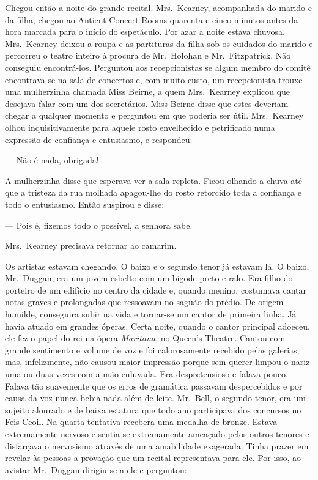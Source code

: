 Chegou então a noite do grande recital.  Mrs.~Kearney, acompanhada do marido e
da filha, chegou ao Antient Concert Rooms quarenta e cinco minutos antes da
hora marcada para o início do espetáculo.  Por azar a noite estava chuvosa.
Mrs.~Kearney deixou a roupa e as partituras da filha sob os cuidados do marido
e percorreu o teatro inteiro à procura de Mr.~Holohan e Mr.~Fitzpatrick.  Não
conseguiu encontrá-los.  Perguntou aos recepcionistas se algum membro do comitê
encontrava-se na sala de concertos e, com muito custo, um recepcionista trouxe
uma mulherzinha chamada Miss Beirne, a quem Mrs.~Kearney explicou que desejava
falar com um dos secretários.  Miss Beirne disse que estes deveriam chegar a
qualquer momento e perguntou em que poderia ser útil.  Mrs.~Kearney olhou
inquisitivamente para aquele rosto envelhecido e petrificado numa expressão de
confiança e entusiasmo, e respondeu:

--- Não é nada, obrigada!

A mulherzinha disse que esperava ver a sala repleta.  Ficou olhando a chuva até
que a tristeza da rua molhada apagou-lhe do rosto retorcido toda a confiança e
todo o entusiasmo.  Então suspirou e disse:

--- Pois é, fizemos todo o possível, a senhora sabe.

Mrs.~Kearney precisava retornar ao camarim.

Os artistas estavam chegando.  O baixo e o segundo tenor já estavam lá.  O
baixo, Mr.~Duggan, era um jovem esbelto com um bigode preto e ralo.  Era filho
do porteiro de um edifício no centro da cidade e, quando menino, costumava
cantar notas graves e prolongadas que ressoavam no saguão do prédio.  De origem
humilde, conseguira subir na vida e tornar-se um cantor de primeira linha.  Já
havia atuado em grandes óperas.  Certa noite, quando o cantor principal
adoeceu, ele fez o papel do rei na ópera \textit{Maritana}, no Queen’s Theatre.
Cantou com grande sentimento e volume de voz e foi calorosamente recebido pelas
galerias; mas, infelizmente, não causou maior impressão porque sem querer
limpou o nariz uma ou duas vezes com a mão enluvada.  Era despretensioso e
falava pouco.  Falava tão suavemente que os erros de gramática passavam
despercebidos e por causa da voz nunca bebia nada além de leite.  Mr.~Bell, o
segundo tenor, era um sujeito alourado e de baixa estatura que todo ano
participava dos concursos no Feis Ceoil.  Na quarta tentativa recebera uma
medalha de bronze.  Estava extremamente nervoso e sentia-se extremamente
ameaçado pelos outros tenores e disfarçava o nervosismo através de uma
amabilidade exagerada.  Tinha prazer em revelar às pessoas a provação que um
recital representava para ele.  Por isso, ao avistar Mr.~Duggan dirigiu-se a
ele e perguntou:

